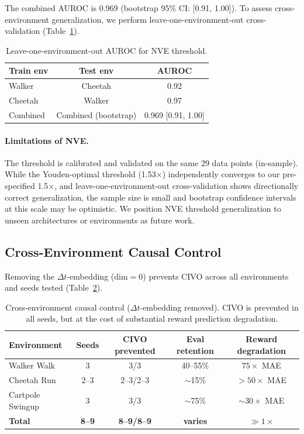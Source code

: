 \documentclass[10pt,letterpaper]{article}
\newcommand{\dt}{\Delta t}
\begin{document}
The combined AUROC is 0.969 (bootstrap 95\% CI: [0.91, 1.00]). To assess cross-environment generalization, we perform leave-one-environment-out cross-validation (Table~\ref{tab:nve_loocv}).

\begin{table}[h]
\centering
\caption{Leave-one-environment-out AUROC for NVE threshold.}
\label{tab:nve_loocv}
\begin{tabular}{lcc}
\toprule
\textbf{Train env} & \textbf{Test env} & \textbf{AUROC} \\
\midrule
Walker   & Cheetah & 0.92 \\
Cheetah  & Walker  & 0.97 \\
Combined & Combined (bootstrap) & 0.969 [0.91, 1.00] \\
\bottomrule
\end{tabular}
\end{table}

\paragraph{Limitations of NVE.}
The threshold is calibrated and validated on the same 29 data points (in-sample). While the Youden-optimal threshold (1.53$\times$) independently converges to our pre-specified 1.5$\times$, and leave-one-environment-out cross-validation shows directionally correct generalization, the sample size is small and bootstrap confidence intervals at this scale may be optimistic. We position NVE threshold generalization to unseen architectures or environments as future work.

\subsection{Cross-Environment Causal Control}
\label{sec:causal_control}

Removing the $\dt$-embedding ($\text{dim}=0$) prevents CIVO across all environments and seeds tested (Table~\ref{tab:causal_control_final}).

\begin{table}[h]
\centering
\caption{Cross-environment causal control ($\dt$-embedding removed). CIVO is prevented in all seeds, but at the cost of substantial reward prediction degradation.}
\label{tab:causal_control_final}
\begin{tabular}{lcccc}
\toprule
\textbf{Environment} & \textbf{Seeds} & \textbf{CIVO prevented} & \textbf{Eval retention} & \textbf{Reward degradation} \\
\midrule
Walker Walk      & 3   & 3/3 & 40--55\%  & $75\times$ MAE \\
Cheetah Run      & 2--3 & 2--3/2--3 & $\sim$15\% & $>50\times$ MAE \\
Cartpole Swingup & 3   & 3/3 & $\sim$75\%  & $\sim 30\times$ MAE \\
\midrule
\textbf{Total}   & \textbf{8--9} & \textbf{8--9/8--9} & \textbf{varies} & $\gg 1\times$ \\
\bottomrule
\end{tabular}
\end{table}
\end{document}
